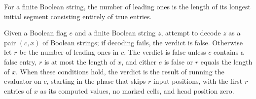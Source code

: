 \begin{definition}
\label{BoolCircuit.CircuitEval.leadOnes}
\leanok
For a finite Boolean string, the number of leading ones is the length of its longest
initial segment consisting entirely of true entries.
\end{definition}

\begin{definition}
\label{BoolCircuit.CircuitEval.verdict}
\leanok
{}
Given a Boolean flag $e$ and a finite Boolean string $z$, attempt to decode $z$ as a
pair $(c,x)$ of Boolean strings; if decoding fails, the verdict is false. Otherwise let
$r$ be the number of leading ones in $c$. The verdict is false unless $c$ contains a
false entry, $r$ is at most the length of $x$, and either $e$ is false or $r$ equals the
length of $x$. When these conditions hold, the verdict is the result of running the
evaluator on $c$, starting in the phase that skips $r$ input positions, with the first
$r$ entries of $x$ as its computed values, no marked cells, and head position zero.
\end{definition}
